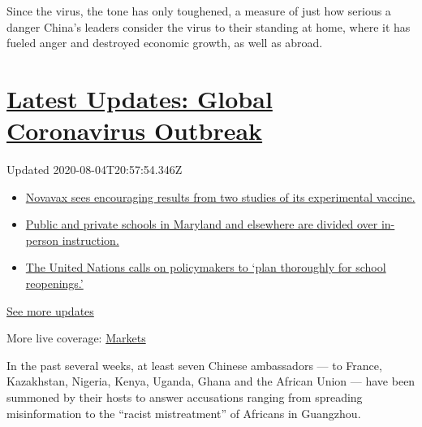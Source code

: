 Since the virus, the tone has only toughened, a measure of just how
serious a danger China's leaders consider the virus to their standing at
home, where it has fueled anger and destroyed economic growth, as well
as abroad.

\hypertarget{latest-updates-global-coronavirus-outbreak}{%
\section{\texorpdfstring{\href{https://www.nytimes.com/2020/08/04/world/coronavirus-cases.html?action=click\&pgtype=Article\&state=default\&region=MAIN_CONTENT_1\&context=storylines_live_updates}{Latest
Updates: Global Coronavirus
Outbreak}}{Latest Updates: Global Coronavirus Outbreak}}\label{latest-updates-global-coronavirus-outbreak}}

Updated 2020-08-04T20:57:54.346Z

\begin{itemize}
\tightlist
\item
  \href{https://www.nytimes.com/2020/08/04/world/coronavirus-cases.html?action=click\&pgtype=Article\&state=default\&region=MAIN_CONTENT_1\&context=storylines_live_updates\#link-1228a480}{Novavax
  sees encouraging results from two studies of its experimental
  vaccine.}
\item
  \href{https://www.nytimes.com/2020/08/04/world/coronavirus-cases.html?action=click\&pgtype=Article\&state=default\&region=MAIN_CONTENT_1\&context=storylines_live_updates\#link-4825b93}{Public
  and private schools in Maryland and elsewhere are divided over
  in-person instruction.}
\item
  \href{https://www.nytimes.com/2020/08/04/world/coronavirus-cases.html?action=click\&pgtype=Article\&state=default\&region=MAIN_CONTENT_1\&context=storylines_live_updates\#link-50f7386d}{The
  United Nations calls on policymakers to `plan thoroughly for school
  reopenings.'}
\end{itemize}

\href{https://www.nytimes.com/2020/08/04/world/coronavirus-cases.html?action=click\&pgtype=Article\&state=default\&region=MAIN_CONTENT_1\&context=storylines_live_updates}{See
more updates}

More live coverage:
\href{https://www.nytimes.com/live/2020/08/04/business/stock-market-today-coronavirus?action=click\&pgtype=Article\&state=default\&region=MAIN_CONTENT_1\&context=storylines_live_updates}{Markets}

In the past several weeks, at least seven Chinese ambassadors --- to
France, Kazakhstan, Nigeria, Kenya, Uganda, Ghana and the African Union
--- have been summoned by their hosts to answer accusations ranging from
spreading misinformation to the ``racist mistreatment'' of Africans in
Guangzhou.

